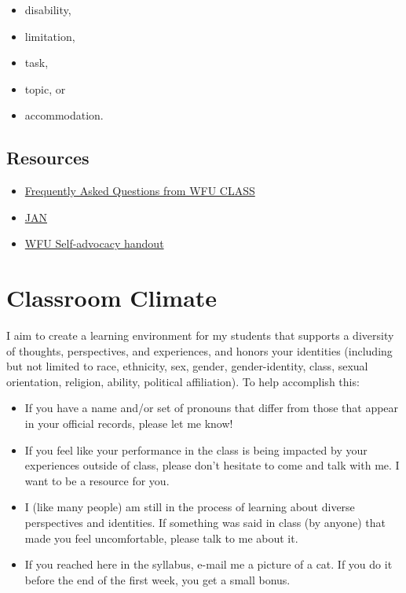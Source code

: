 \begin{itemize}
\tightlist
\item
  disability,
\item
  limitation,
\item
  task,
\item
  topic, or
\item
  accommodation.
\end{itemize}

\hypertarget{resources}{%
\section{Resources}\label{resources}}

\begin{itemize}
\tightlist
\item
  \href{https://class.wfu.edu/frequently-asked-questions-about-lac-ds/}{Frequently Asked Questions from WFU CLASS}
\item
  \href{https://askjan.org/}{JAN}
\item
  \href{https://docs.google.com/document/d/1X44zJyTz8-s9t6IXw0bII2DCFiOk1NR2MRfTi8wBiIc/}{WFU Self-advocacy handout}
\end{itemize}

\hypertarget{classroom-climate}{%
\chapter{Classroom Climate}\label{classroom-climate}}

I aim to create a learning environment for my students that supports a diversity of thoughts, perspectives, and experiences, and honors your identities (including but not limited to race, ethnicity, sex, gender, gender-identity, class, sexual orientation, religion, ability, political affiliation). To help accomplish this:

\begin{itemize}
\item
  If you have a name and/or set of pronouns that differ from those that appear in your official records, please let me know!
\item
  If you feel like your performance in the class is being impacted by your experiences outside of class, please don't hesitate to come and talk with me. I want to be a resource for you.
\item
  I (like many people) am still in the process of learning about diverse perspectives and identities. If something was said in class (by anyone) that made you feel uncomfortable, please talk to me about it.
\item
  If you reached here in the syllabus, e-mail me a picture of a cat. If you do it before the end of the first week, you get a small bonus.
\end{itemize}

